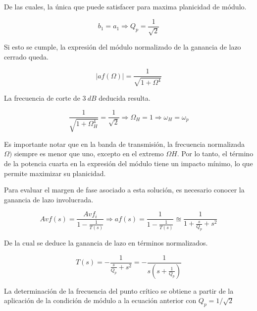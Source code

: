 \bigskip
\hspace{1mm} De las cuales, la única que puede satisfacer para maxima planicidad de módulo.

\begin{equation}
    b_1 = a_1 \Longrightarrow Q_p = \frac{1}{\sqrt{2}}
\end{equation}

\bigskip
\hspace{1mm} Si esto se cumple, la expresión del módulo normalizado de la ganancia de lazo cerrado queda.

\begin{equation}
    |af(\Omega)| = \frac{1}{\sqrt{1 + \Omega ^4}}
\end{equation}

\bigskip
\hspace{1mm} La frecuencia de corte de \(3~dB\) deducida resulta.

\begin{equation}
    \frac{1}{\sqrt{1 + \Omega _H ^4}} = \frac{1}{\sqrt{2}} \Longrightarrow \Omega _H = 1 \Longrightarrow \omega _H = \omega _p
\end{equation}

\bigskip
\hspace{1mm} Es importante notar que en la banda de transmisión, la frecuencia normalizada \( \Omega )\) siempre es menor que uno, excepto en el extremo \( \Omega H \). Por lo tanto, el término de la potencia cuarta en la expresión del módulo tiene un impacto mínimo, lo que permite maximizar su planicidad.

\hspace{1mm} Para evaluar el margen de fase asociado a esta solución, es necesario conocer la ganancia de lazo involucrada.

\begin{equation}
    Avf (s) = \frac{Avf_i}{1 - \frac{1}{T(s)}} \Longrightarrow af(s) = \frac{1}{1 - \frac{1}{T(s)}} \approxeq \frac{1}{1 + \frac{s}{Q_p} + s^2}
\end{equation}

\bigskip
\hspace{1mm} De la cual se deduce la ganancia de lazo en términos normalizados.

\begin{equation}
    T(s) = - \frac{1}{\frac{s}{Q_p} + s^2} = - \frac{1}{s (s + \frac{1}{Q_p})}
\end{equation}

\bigskip
\hspace{1mm} La determinación de la frecuencia del punto crítico se obtiene a partir de la aplicación de la condición de módulo a la ecuación anterior con \( Q_p = 1/\sqrt{2} \)

